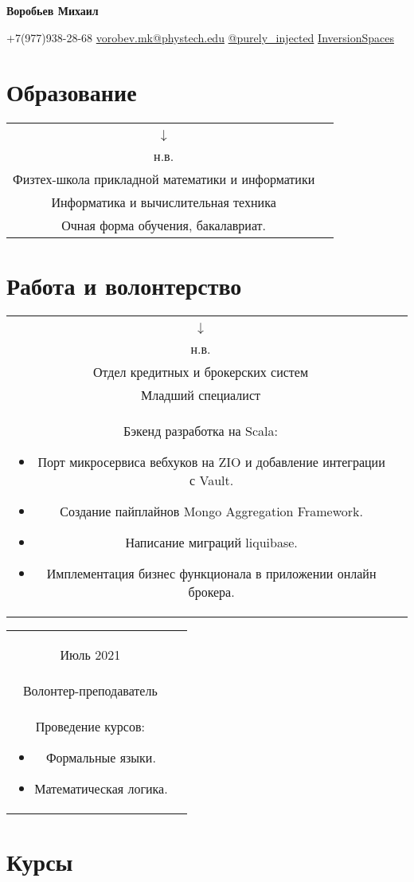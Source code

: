 \documentclass{article}
\makeatletter
\renewcommand{\maketitle}{
    \Huge
    \begin{center}
        \textbf{Воробьев Михаил}
    \end{center}

    \small
    \begin{center}
    \faMobile \hspace{0.1cm} $\boldsymbol{+}$7(977)938-28-68 
    \hfill
    \faEnvelope \hspace{0.1cm} \href{mailto:vorobev.mk@phystech.edu}{vorobev.mk@phystech.edu}
    \hfill
    \faPaperPlane \hspace{0.1cm} \href{https://t.me/purely_injected}{@purely\_injected}
    \hfill
    \faGithub \hspace{0.1cm} \href{https://github.com/InversionSpaces}{InversionSpaces}
    \end{center}
}
\newcommand{\entry}[3]{
	\begin{tabular}{ c | c }
    \begin{minipage}{0.05\linewidth}
    	\begin{center}
    		#1
    	\end{center}
    \end{minipage} 
    &
    \begin{minipage}{0.85\linewidth}
        \textbf{#2} \\ \footnotesize{#3}
    \end{minipage}
    \end{tabular}
}
\newcommand{\interval}[2]{
	#1 \\ $\downarrow$ \\ #2
}
\makeatother
\begin{document}
    \maketitle
    \small
    
    \section{Образование}
        \entry {\interval{2019}{н.в.}}
        {Московский физико-технический институт\\
         Физтех-школа прикладной математики и информатики\\
         Информатика и вычислительная техника}
        {Очная форма обучения, бакалавриат.}

    \section{Работа и волонтерство}
        \entry {\interval{Фев. 2021}{н.в.}}
        {Тинькофф \\
         Отдел кредитных и брокерских систем \\
         Младший специалист}
        {Бэкенд разработка на Scala:
        	\begin{itemize}
        		\item Порт микросервиса вебхуков на ZIO и добавление интеграции с Vault.
        		\item Создание пайплайнов Mongo Aggregation Framework.
        		\item Написание миграций liquibase.
        		\item Имплементация бизнес функционала в приложении онлайн брокера.
        	\end{itemize}
        }
        
        \vspace{.1cm}
        
        \entry {Июль 2021}
        {Летняя школа Слон в Пущино \\
         Волонтер-преподаватель}
        {Проведение курсов:
        	\begin{itemize}
        		\item Формальные языки.
        		\item Математическая логика.
        	\end{itemize}
    	}  

    \section{Курсы}
    
\end{document}
